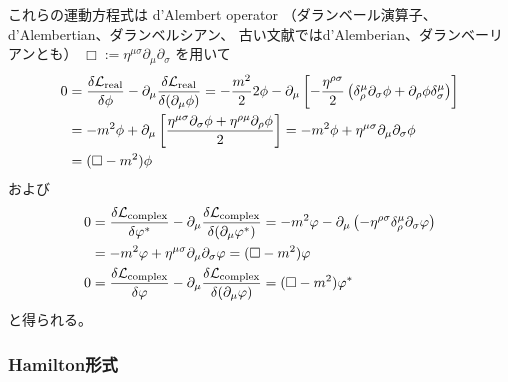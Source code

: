 これらの運動方程式は
d'Alembert operator
（ダランベール演算子、
d'Alembertian、ダランベルシアン、
古い文献ではd'Alemberian、ダランベーリアンとも）
$\Box := \eta^{\mu \sigma}
    \partial_\mu
    \partial_\sigma$
を用いて
\begin{align}
    0 &=
    \dfrac{\delta \mathcal{L}_{\rm real}}
        {\delta \phi}
    -
    \partial_\mu
    \dfrac{\delta \mathcal{L}_{\rm real}}
        {\delta (\partial_\mu \phi)}
    =
    - \dfrac{m^2}{2}2 \phi
    -
    \partial_\mu
    \left[
        -
        \dfrac{ \eta^{\rho \sigma} }{2}
        \left(
            \delta_\rho^\mu
            \partial_\sigma \phi
        +
            \partial_\rho \phi
            \delta_\sigma^\mu
        \right)
    \right]
\notag\\&
    =
    - m^2 \phi
    +
    \partial_\mu
    \left[
        \dfrac{
            \eta^{\mu \sigma}
            \partial_\sigma \phi
        +
            \eta^{\rho \mu}
            \partial_\rho \phi
        }{2}
    \right]
    =
    - m^2 \phi
    +
    \eta^{\mu \sigma}
        \partial_\mu
        \partial_\sigma
    \phi
\notag\\&
    =
    (\Box - m^2) \phi
\end{align}
および
\begin{subequations}
\begin{align}
    0 &=
    \dfrac{\delta \mathcal{L}_{\rm complex}}
        {\delta \varphi^*}
    -
    \partial_\mu
    \dfrac{\delta \mathcal{L}_{\rm complex}}
        {\delta (\partial_\mu \varphi^*)}
    =
    -
    m^2 \varphi
    -
    \partial_\mu
    \left(
        -
        \eta^{\rho\sigma}
        \delta_\rho^\mu
        \partial_\sigma \varphi        
    \right)
\notag\\&
    =
    -
    m^2 \varphi
    +
    \eta^{\mu\sigma}
        \partial_\mu
        \partial_\sigma
        \varphi
    =
    (\Box - m^2)
    \varphi
\\
    0 &=
    \dfrac{\delta \mathcal{L}_{\rm complex}}
        {\delta \varphi}
    -
    \partial_\mu
    \dfrac{\delta \mathcal{L}_{\rm complex}}
        {\delta (\partial_\mu \varphi)}
    =
    (\Box - m^2)
    \varphi^*
\end{align}
\end{subequations}
と得られる。

\subsubsection{Hamilton形式}

